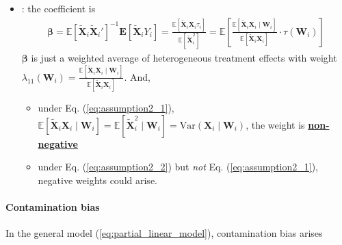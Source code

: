 \documentclass[twoside]{article}
\begin{document}
\begin{itemize}
    \item {}: the coefficient is 
    \begin{align*}
        \boldsymbol{\beta} = \mathbb{E}\left[ \tilde{\mathbf{X}}_i \tilde{\mathbf{X}}_i' \right]^{-1}\mathbf{E}[\tilde{\mathbf{X}}_i Y_i] =\frac{\mathbb{E}\left[\tilde{\mathbf{X}}_i {\mathbf{X}}_i \tau_i\right]}{\mathbb{E}\left[\tilde{\mathbf{X}}_i^2\right]} = \mathbb{E}\left[ \frac{\mathbb{E}\left[\tilde{\mathbf{X}}_i {\mathbf{X}}_i \mid \mathbf{W}_i\right]}{\mathbb{E}\left[\tilde{\mathbf{X}}_i{\mathbf{X}}_i\right]} \cdot \tau(\mathbf{W}_i)\right]
    \end{align*}
    $\boldsymbol{\beta}$ is just a weighted average of heterogeneous treatment effects with weight $\lambda_{11}(\mathbf{W}_i) = \frac{\mathbb{E}\left[\tilde{\mathbf{X}}_i {\mathbf{X}}_i \mid \mathbf{W}_i\right]}{\mathbb{E}\left[\tilde{\mathbf{X}}_i{\mathbf{X}}_i\right]}$. And, 
    \begin{itemize}
        \item under Eq. (\ref{eq:assumption2_1}), $\mathbb{E}\left[\tilde{\mathbf{X}}_i\mathbf{X}_i\mid \mathbf{W}_i\right] = \mathbb{E}\left[\tilde{\mathbf{X}}_i^2\mid \mathbf{W}_i\right] = \mathrm{Var}\left(\mathbf{X}_i\mid \mathbf{W}_i\right)$, the weight is \textbf{\underline{non-negative}}
        \item under Eq. (\ref{eq:assumption2_2}) but \textit{not} Eq. (\ref{eq:assumption2_1}), negative weights could arise.
    \end{itemize}
\end{itemize}

\paragraph*{Contamination bias}
In the general model (\ref{eq:partial_linear_model}), contamination bias arises
\end{document}
